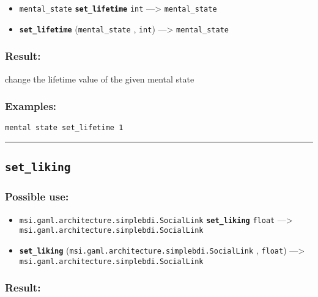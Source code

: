 \documentclass[]{book}
\providecommand{\tightlist}{%
  \setlength{\itemsep}{0pt}\setlength{\parskip}{0pt}}
\theoremstyle{definition}
\theoremstyle{definition}
\theoremstyle{definition}
\theoremstyle{remark}
\begin{document}
\begin{itemize}
\tightlist
\item
  \texttt{mental\_state} \textbf{\texttt{set\_lifetime}} \texttt{int}
  ---\textgreater{} \texttt{mental\_state}
\item
  \textbf{\texttt{set\_lifetime}} (\texttt{mental\_state} ,
  \texttt{int}) ---\textgreater{} \texttt{mental\_state}
\end{itemize}

\subsubsection{Result:}\label{result-445}

change the lifetime value of the given mental state

\subsubsection{Examples:}\label{examples-318}

\begin{verbatim}
mental state set_lifetime 1 
\end{verbatim}

\begin{center}\rule{0.5\linewidth}{\linethickness}\end{center}

\subsection{\texorpdfstring{\texttt{set\_liking}}{set\_liking}}\label{set_liking}

\subsubsection{Possible use:}\label{possible-use-462}

\begin{itemize}
\tightlist
\item
  \texttt{msi.gaml.architecture.simplebdi.SocialLink}
  \textbf{\texttt{set\_liking}} \texttt{float} ---\textgreater{}
  \texttt{msi.gaml.architecture.simplebdi.SocialLink}
\item
  \textbf{\texttt{set\_liking}}
  (\texttt{msi.gaml.architecture.simplebdi.SocialLink} , \texttt{float})
  ---\textgreater{} \texttt{msi.gaml.architecture.simplebdi.SocialLink}
\end{itemize}

\subsubsection{Result:}\label{result-446}
\end{document}
